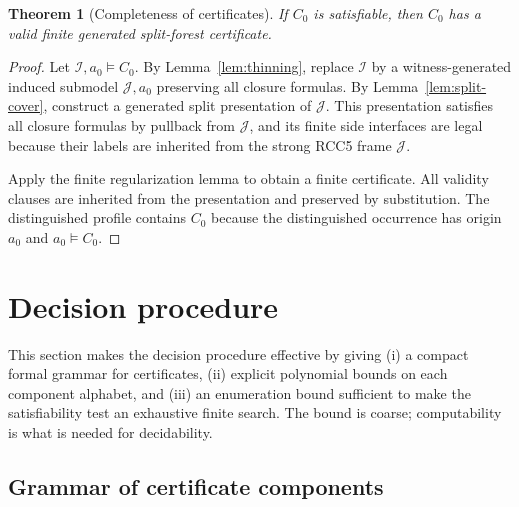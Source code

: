 \documentclass[11pt]{article}
\newtheorem{theorem}{Theorem}[section]
\newcommand{\I}{\mathcal I}
\newcommand{\J}{\mathcal J}
\begin{document}
\begin{theorem}[Completeness of certificates]\label{thm:completeness}
If $C_0$ is satisfiable, then $C_0$ has a valid finite generated split-forest certificate.
\end{theorem}

\begin{proof}
Let $\I,a_0\models C_0$.  By Lemma~\ref{lem:thinning}, replace $\I$ by a witness-generated induced submodel $\J,a_0$ preserving all closure formulas.  By Lemma~\ref{lem:split-cover}, construct a generated split presentation of $\J$.  This presentation satisfies all closure formulas by pullback from $\J$, and its finite side interfaces are legal because their labels are inherited from the strong RCC5 frame $\J$.

Apply the finite regularization lemma to obtain a finite certificate.  All validity clauses are inherited from the presentation and preserved by substitution.  The distinguished profile contains $C_0$ because the distinguished occurrence has origin $a_0$ and $a_0\models C_0$.
\end{proof}

\section{Decision procedure}

This section makes the decision procedure effective by giving (i) a
compact formal grammar for certificates, (ii) explicit polynomial
bounds on each component alphabet, and (iii) an enumeration bound
sufficient to make the satisfiability test an exhaustive finite
search.  The bound is coarse; computability is what is needed for
decidability.

\subsection{Grammar of certificate components}
\label{ssec:grammar}
\end{document}
